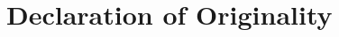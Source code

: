 \documentclass[diss.tex]{subfiles}
\begin{document}
\chapter*{Declaration of Originality}
\end{document}
